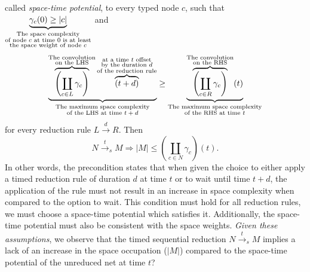 \documentclass{fit-teorsem}
\begin{document}
\begin{itemize}
		called \textit{space-time potential}, to every typed node $c$, such that
		$\underbrace{\gamma_c(0) \ge |c|}_{\begin{subarray}{c}
			\text{The space complexity} \\
			\text{of node $c$ at time $0$ is at least} \\
			\text{the space weight of node $c$}
		\end{subarray}}$ and \[
			\underbrace{\overbrace{\left(\coprod_{c \in L} \gamma_c\right)}^{\begin{subarray}{c}
					\text{The convolution} \\
					\text{on the LHS}
				\end{subarray}}\overbrace{(t + d)}^{\begin{subarray}{c}
					\text{at a time $t$ offset} \\
					\text{by the duration $d$} \\
					\text{of the reduction rule}
				\end{subarray}}}_{
			\begin{subarray}{c}
				\text{The maximum space complexity} \\
				\text{of the LHS at time $t + d$}
			\end{subarray}}
				\ge \underbrace{\overbrace{\left(\coprod_{c \in R} \gamma_c\right)}^{\begin{subarray}{c}
						\text{The convolution} \\
						\text{on the RHS}
					\end{subarray}}(t)}_{
				\begin{subarray}{c}
					\text{The maximum space complexity} \\
					\text{of the RHS at time $t$}
				\end{subarray}}
		\] for every reduction rule $L \stackrel{d}{\longrightarrow} R$. Then \[
			N \stackrel{t}{\longrightarrow}_s M
				\Longrightarrow |M| \le \left(\coprod_{c \in N} \gamma_c\right)(t)
		.\]
		In other words, the precondition states that when given the choice to either apply a timed
		reduction rule of duration $d$ at time $t$ or to wait until time $t + d$, the application
		of the rule must not result in an increase in space complexity when compared to the option
		to wait. This condition must hold for all reduction rules, we must choose a space-time
		potential which satisfies it. Additionally, the space-time potential must also be consistent
		with the space weights. \textit{Given these assumptions}, we observe that the timed sequential
		reduction $N \stackrel{t}{\longrightarrow}_s M$ implies a lack of an increase in the space
		occupation ($|M|$) compared to the space-time potential of the unreduced net at time $t$?


\end{itemize}
\end{document}
